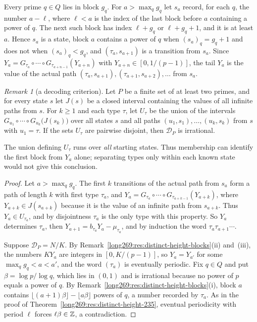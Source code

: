 \documentclass[11pt]{article}
\theoremstyle{remark}
\newtheorem{recordremark}[theorem]{Remark}
\renewenvironment{remark}[1][]{\begin{recordremark}[#1]}{\end{recordremark}}
\theoremstyle{plain}
\begin{document}
Every prime $q\in Q$ lies in block $g_q$.  For $a>\max_qg_q$ let $s_a$ record,
for each $q$, the number $a-\ell$, where $\ell<a$ is the index of the last
block before $a$ containing a power of $q$.  The next such block has index
$\ell+g_q$ or $\ell+g_q+1$, and it is at least $a$.  Hence $s_a$ is a state,
block $a$ contains a power of $q$ when $(s_a)_q=g_q+1$ and does not when
$(s_a)_q<g_q$, and $(\tau_a,s_{a+1})$ is a transition from $s_a$.  Since
$Y_a=G_{\tau_a}\circ\cdots\circ G_{\tau_{a+n-1}}(Y_{a+n})$ with
$Y_{a+n}\in[0,1/(p-1)]$, the tail $Y_a$ is the value of the actual path
$(\tau_a,s_{a+1}),(\tau_{a+1},s_{a+2}),\ldots$ from $s_a$.

\begin{remark}[a decoding criterion]\label{long269:res:distinct-height-criterion}
Let $P$ be a finite set of at least two primes, and for every state $s$ let
$J(s)$ be a closed interval containing the values of all infinite paths from
$s$.  For $k\ge1$ and each type $\tau$, let $U_\tau$ be the union of the
intervals $G_{u_1}\circ\cdots\circ G_{u_k}\bigl(J(s_k)\bigr)$ over all states
$s$ and all paths $(u_1,s_1),\ldots,(u_k,s_k)$ from $s$ with $u_1=\tau$.  If
the sets $U_\tau$ are pairwise disjoint, then $\mathcal D_P$ is irrational.
\end{remark}


The union defining $U_\tau$ runs over \emph{all} starting states.
Thus membership can identify the first block from $Y_a$ alone; separating
types only within each known state would not give this conclusion.

\begin{proof}
Let $a>\max_qg_q$.  The first $k$ transitions of the actual path from $s_a$
form a path of length $k$ with first type $\tau_a$, and
$Y_a=G_{\tau_a}\circ\cdots\circ G_{\tau_{a+k-1}}(Y_{a+k})$, where
$Y_{a+k}\in J(s_{a+k})$ because it is the value of an infinite path from
$s_{a+k}$.  Thus $Y_a\in U_{\tau_a}$, and by disjointness $\tau_a$ is the
only type with this property.  So $Y_a$ determines $\tau_a$, then
$Y_{a+1}=b_{\tau_a}Y_a-\mu_{\tau_a}$, and by induction the word
$\tau_a\tau_{a+1}\cdots$.

Suppose $\mathcal D_P=N/K$.  By
Remark~\ref{long269:res:distinct-height-blocks}(ii) and~(iii), the numbers
$KY_a$ are integers in $[0,K/(p-1)]$, so $Y_a=Y_{a'}$ for some
$\max_qg_q<a<a'$, and the word $(\tau_a)$ is eventually periodic.  Fix
$q\in Q$ and put $\beta=\log p/\log q$, which lies in $(0,1)$ and is
irrational because no power of $p$ equals a power of $q$.  By
Remark~\ref{long269:res:distinct-height-blocks}(i), block $a$ contains
$\lfloor(a+1)\beta\rfloor-\lfloor a\beta\rfloor$ powers of $q$, a number
recorded by $\tau_a$.  As in the proof of
Theorem~\ref{long269:res:distinct-height-235}, eventual periodicity with
period $\ell$ forces $\ell\beta\in\mathbb{Z}$, a contradiction.
\end{proof}
\end{document}
